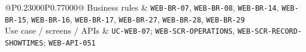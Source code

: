 \begin{longtable}{@{}P{0.23000\SRSWidth}P{0.77000\SRSWidth}@{}}
Business rules & \texttt{WEB-\allowbreak{}BR-\allowbreak{}07}, \texttt{WEB-\allowbreak{}BR-\allowbreak{}08}, \texttt{WEB-\allowbreak{}BR-\allowbreak{}14}, \texttt{WEB-\allowbreak{}BR-\allowbreak{}15}, \texttt{WEB-\allowbreak{}BR-\allowbreak{}16}, \texttt{WEB-\allowbreak{}BR-\allowbreak{}17}, \texttt{WEB-\allowbreak{}BR-\allowbreak{}27}, \texttt{WEB-\allowbreak{}BR-\allowbreak{}28}, \texttt{WEB-\allowbreak{}BR-\allowbreak{}29} \\[3pt]
Use case /\allowbreak{} screens /\allowbreak{} APIs & \texttt{UC-\allowbreak{}WEB-\allowbreak{}07}; \texttt{WEB-\allowbreak{}SCR-\allowbreak{}OPERATIO\allowbreak{}NS}, \texttt{WEB-\allowbreak{}SCR-\allowbreak{}RECORD-\allowbreak{}SHOWTIME\allowbreak{}S}; \texttt{WEB-\allowbreak{}API-\allowbreak{}051} \\[3pt]
\end{longtable}
\endgroup

